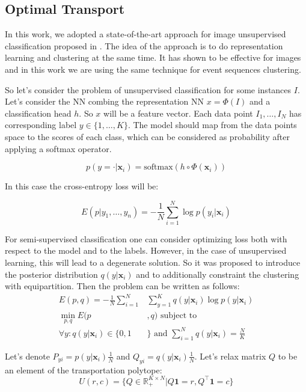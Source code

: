 \documentclass[10pt]{article}
\begin{document}
\subsection{Optimal Transport}\label{sec:ot}
In this work, we adopted a state-of-the-art approach for image unsupervised classification proposed in \cite{asano2020self}. The idea of the approach is to do representation learning and clustering at the same time. It has shown to be effective for images and in this work we are using the same technique for event sequences clustering.

So let's consider the problem of unsupervised classification for some instances $I$. Let's consider the NN combing the representation NN $x = \Phi(I)$ and a classification head $h$. So $x$ will be a feature vector. Each data point $I_1,\dots, I_N$ has corresponding label $y\in\{1,\dots,K\}$. The model should map from the data points space to the scores of each class, which can be considered as probability after applying a softmax operator.

\begin{equation}
    p(y = \cdot|\mathbf{x}_i) = \mathrm{softmax}(h  \circ \Phi(\mathbf{x}_i))
\end{equation}

In this case the cross-entropy loss will be:

\begin{equation}
    E(p|y_1,\dots,y_n) = - \frac{1}{N}\sum_{i=1}^N \log p(y_i|\mathbf{x}_i)
\end{equation}

For semi-supervised classification one can consider optimizing loss both with respect to the model and to the labels. However, in the case of unsupervised learning, this will lead to a degenerate solution. So it was proposed to introduce the posterior distribution $q(y|\mathbf{x}_i)$ and to additionally constraint the clustering with equipartition. Then the problem can be written as follows:
\begin{equation}
    \begin{split}
       E(p,q) = -\frac{1}{N}\sum_{i=1}^N&\sum_{y = 1}^K q(y|\mathbf{x}_i)\log p(y|\mathbf{x}_i)\\
       \min_{p,q} E(p&,q)\text{ subject to }\\ \forall y: q(y|\mathbf{x}_i) \in \{0,1&\} \text{ and } \sum_{i=1}^N q(y|\mathbf{x}_i)=\frac{N}{K}
    \end{split}
\end{equation}

Let's denote $P_{yi} = p(y|\mathbf{x}_i)\frac{1}{N}$ and $Q_{yi} = q(y|\mathbf{x}_i)\frac{1}{N}$. Let's relax matrix $Q$ to be an element of the transportation polytope:
\begin{equation}
U(r,c) = \{Q\in \mathbb{R}_{+}^{K\times N}|Q\mathbf{1} = r, Q^{\top} \mathbf{1} = c\}
\end{equation}
\end{document}
